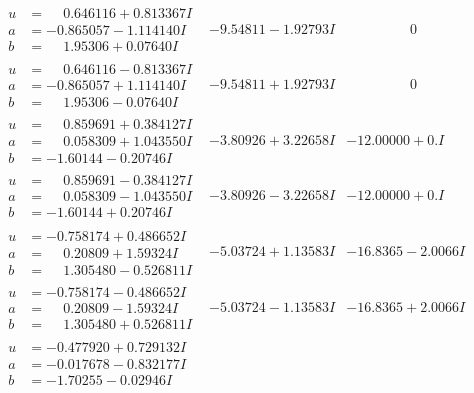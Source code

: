 \documentclass[1p]{elsarticle_modified}
\theoremstyle{definition}
\begin{document}
$$\begin{array}{c|c|c}
\begin{aligned}
u &= \phantom{-}0.646116 + 0.813367 I \\
a &= -0.865057 - 1.114140 I \\
b &= \phantom{-}1.95306 + 0.07640 I\end{aligned}
 & -9.54811 - 1.92793 I & \phantom{-0.000000 } 0 \\ \hline\begin{aligned}
u &= \phantom{-}0.646116 - 0.813367 I \\
a &= -0.865057 + 1.114140 I \\
b &= \phantom{-}1.95306 - 0.07640 I\end{aligned}
 & -9.54811 + 1.92793 I & \phantom{-0.000000 } 0 \\ \hline\begin{aligned}
u &= \phantom{-}0.859691 + 0.384127 I \\
a &= \phantom{-}0.058309 + 1.043550 I \\
b &= -1.60144 - 0.20746 I\end{aligned}
 & -3.80926 + 3.22658 I & -12.00000 + 0. I\phantom{ +0.000000I} \\ \hline\begin{aligned}
u &= \phantom{-}0.859691 - 0.384127 I \\
a &= \phantom{-}0.058309 - 1.043550 I \\
b &= -1.60144 + 0.20746 I\end{aligned}
 & -3.80926 - 3.22658 I & -12.00000 + 0. I\phantom{ +0.000000I} \\ \hline\begin{aligned}
u &= -0.758174 + 0.486652 I \\
a &= \phantom{-}0.20809 + 1.59324 I \\
b &= \phantom{-}1.305480 - 0.526811 I\end{aligned}
 & -5.03724 + 1.13583 I & -16.8365 - 2.0066 I \\ \hline\begin{aligned}
u &= -0.758174 - 0.486652 I \\
a &= \phantom{-}0.20809 - 1.59324 I \\
b &= \phantom{-}1.305480 + 0.526811 I\end{aligned}
 & -5.03724 - 1.13583 I & -16.8365 + 2.0066 I \\ \hline\begin{aligned}
u &= -0.477920 + 0.729132 I \\
a &= -0.017678 - 0.832177 I \\
b &= -1.70255 - 0.02946 I\end{aligned}

\end{array}$$
\end{document}
